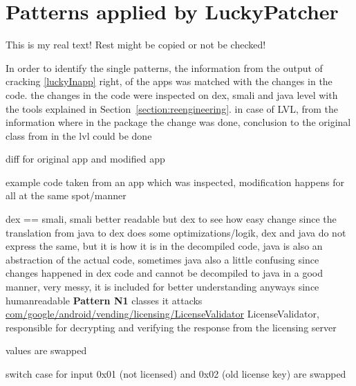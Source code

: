 \section{Patterns applied by LuckyPatcher} \label{section:luckypatcher-patterns}
This is my real text! Rest might be copied or not be checked!

In order to identify the single patterns, the information from the output of cracking \ref{luckyInapp} right, of the apps was matched with the changes in the code. the changes in the code were inspected on dex, smali and java level with the tools explained in Section~\ref{section:reengineering}. in case of LVL, from the information where in the package the change was done, conclusion to the original class from in the lvl could be done

diff for original app and modified app

example code taken from an app which was inspected, modification happens for all at the same spot/manner

dex == smali, smali better readable but dex to see how easy change
since the translation from java to dex does some optimizations/logik, dex and java do not express the same, but it is how it is in the decompiled code, java is also an abstraction of the actual code, sometimes java also a little confusing since changes happened in dex code and cannot be decompiled to java in a good manner, very messy, it is included for better understanding anyways since humanreadable
\newline
\newline
\textbf{Pattern N1} \newline
classes it attacks
\url{com/google/android/vending/licensing/LicenseValidator}
LicenseValidator, responsible for decrypting and verifying the response from the licensing server\cite{developersLicensingReference}



values are swapped



switch case for input 0x01 (not licensed) and 0x02 (old license key) are swapped

